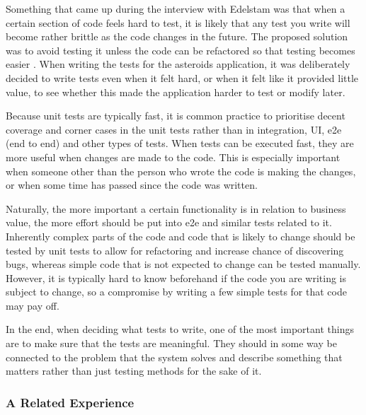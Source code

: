 \documentclass[11pt]{article}
\begin{document}
Something that came up during the interview with Edelstam was that when a certain section of code feels hard to test, it is likely that any test you write will become rather brittle as the code changes in the future. The proposed solution was to avoid testing it unless the code can be refactored so that testing becomes easier \cite[question~30]{Edelstam}. When writing the tests for the asteroids application, it was deliberately decided to write tests even when it felt hard, or when it felt like it provided little value, to see whether this made the application harder to test or modify later.

Because unit tests are typically fast, it is common practice to prioritise decent coverage and corner cases in the unit tests rather than in integration, UI, e2e (end to end) and other types of tests. When tests can be executed fast, they are more useful when changes are made to the code. This is especially important when someone other than the person who wrote the code is making the changes, or when some time has passed since the code was written. \cite[questions~22-24]{Stenmark} %

Naturally, the more important a certain functionality is in relation to business value, the more effort should be put into e2e and similar tests related to it. Inherently complex parts of the code and code that is likely to change should be tested by unit tests to allow for refactoring and increase chance of discovering bugs, whereas simple code that is not expected to change can be tested manually. However, it is typically hard to know beforehand if the code you are writing is subject to change, so a compromise by writing a few simple tests for that code may pay off. \cite[questions~28-29 and 33]{Stenmark}

In the end, when deciding what tests to write, one of the most important things are to make sure that the tests are meaningful. They should in some way be connected to the problem that the system solves and describe something that matters rather than just testing methods for the sake of it. \cite[questions~17-18]{Ahnve}

\subsubsection{A Related Experience}
\label{subsec:openspace}
\end{document}
